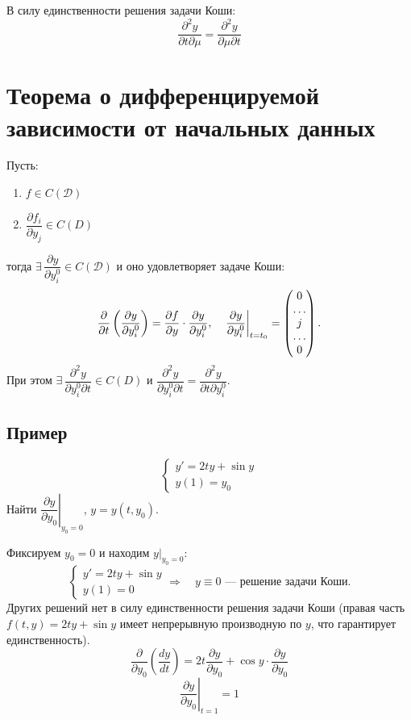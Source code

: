 \documentclass[a4paper,12pt]{article}
\begin{document}
В силу единственности решения задачи Коши:
\[
    \frac{\partial^2 y}{\partial t \partial \mu} = \frac{\partial^2 y}{\partial \mu \partial t}
\]

\section{Теорема о дифференцируемой зависимости от начальных данных}
Пусть:
\begin{enumerate}[label=\arabic*)]
    \item $f \in C(\mathcal{D})$
    \item $\dfrac{\partial f_i}{\partial y_j} \in C(D)$
\end{enumerate}
тогда $\exists \, \dfrac{\partial y}{\partial y_i^0} \in C(\mathcal{D})$ и оно удовлетворяет задаче Коши:
\[
    \frac{\partial}{\partial t} \left( \frac{\partial y}{\partial y_i^0} \right) = \frac{\partial f}{\partial y} \cdot \frac{\partial y}{\partial y_i^0}, \quad \left. \frac{\partial y}{\partial y_i^0} \right|_{t=t_0} = \begin{pmatrix} 0 \\ \dots \\ j \\ \dots \\ 0 \end{pmatrix} \text.
\]
При этом $\exists \, \dfrac{\partial^2 y}{\partial y_i^0 \partial t} \in C(D)$ и $\dfrac{\partial^2 y}{\partial y_i^0 \partial t} = \dfrac{\partial^2 y}{\partial t \partial y_i^0}$.

\subsection*{Пример}
\[
    \begin{cases}
        y' = 2ty + \sin y \\
        y(1) = y_0
    \end{cases}
\]
Найти $\left. \dfrac{\partial y}{\partial y_0} \right|_{y_0 = 0}$, \quad $y = y(t, y_0)$.

Фиксируем $y_0 = 0$ и находим $\left. y \right|_{y_0 = 0}$:
\[
    \begin{cases}
        y' = 2ty + \sin y \\
        y(1) = 0
    \end{cases}
    \Rightarrow \quad y \equiv 0 \text{ — решение задачи Коши}.
\]
Других решений нет в силу единственности решения задачи Коши (правая часть $f(t,y)=2ty+\sin y$ имеет непрерывную производную по $y$, что гарантирует единственность).
\[
    \frac{\partial}{\partial y_0} \left( \frac{dy}{dt} \right) = 2t \frac{\partial y}{\partial y_0} + \cos y \cdot \frac{\partial y}{\partial y_0}
\]
\[
    \left. \frac{\partial y}{\partial y_0} \right|_{t=1} = 1
\]
\end{document}
